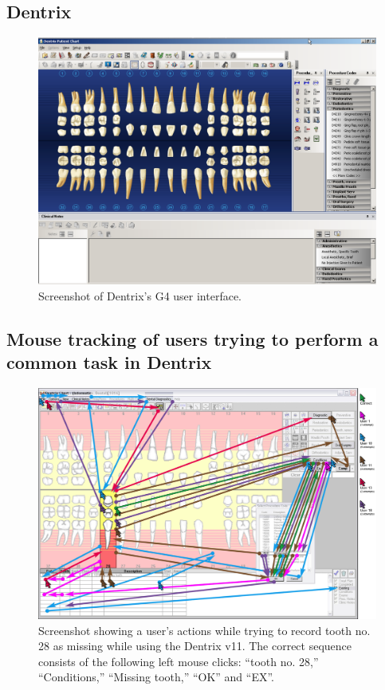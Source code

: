 \documentclass[11pt]{article}
\begin{document}
\subsection{Dentrix}
\label{dentrixplain}

\begin{figure}[h]
\begin{center}
\includegraphics[width=\textwidth]{dentrixss1.png}
\end{center}
\caption{Screenshot of Dentrix's G4 user interface.}
\end{figure}

\newpage

\subsection{Mouse tracking of users trying to perform a common task in Dentrix}
\label{dentrixusabil}
\begin{figure}[h]
\begin{center}
\includegraphics[width=\textwidth]{dentrixuse.png}
\end{center}
\caption{Screenshot showing a user’s actions while trying to record tooth no. 28 as missing while using the Dentrix v11. The correct sequence consists of the following left mouse clicks: “tooth no. 28,” “Conditions,” “Missing tooth,” “OK” and “EX”\cite{Thyvalikakath2008A-usability-eva}.}
\end{figure}
\end{document}
